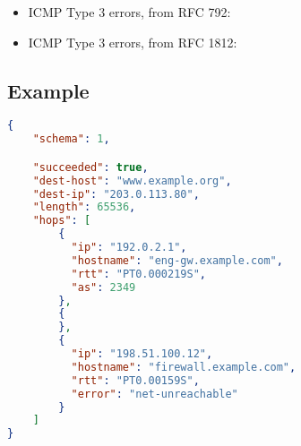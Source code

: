 \documentclass[10pt]{article}
\begin{document}
\begin{itemize}
\item ICMP Type 3 errors, from RFC 792:

\item ICMP Type 3 errors, from RFC 1812:
\end{itemize}


\subsection{Example}
\begin{lstlisting}[language=json]
{
    "schema": 1,

    "succeeded": true,
    "dest-host": "www.example.org",
    "dest-ip": "203.0.113.80",
    "length": 65536,
    "hops": [
        {
          "ip": "192.0.2.1",
          "hostname": "eng-gw.example.com",
          "rtt": "PT0.000219S",
          "as": 2349
        },
        {
        },
        {
          "ip": "198.51.100.12",
          "hostname": "firewall.example.com",
          "rtt": "PT0.00159S",
          "error": "net-unreachable"
        }
    ]
}
\end{lstlisting}
\end{document}
